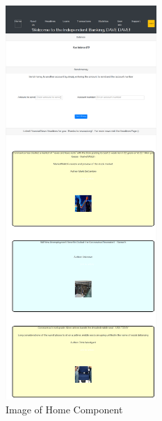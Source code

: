 \begin{figure}[H]
\includegraphics[width=\textwidth,height=15cm]{img/homecomponent.png}
\caption{Image of Home Component}
\label{fig:Image of home component}
\end{figure}
